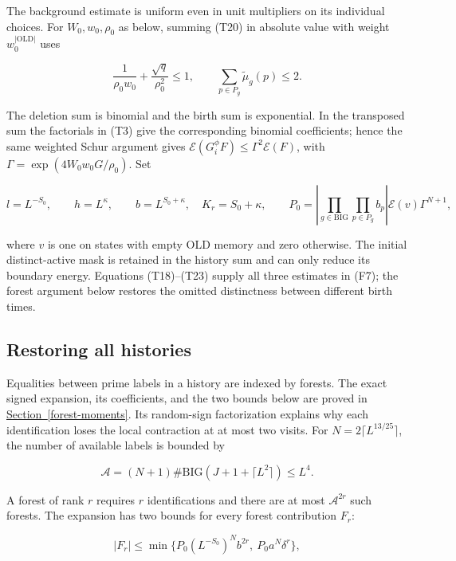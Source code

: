 The background estimate is uniform even in unit multipliers on its
individual choices. For \(W_0,w_0,\rho_0\) as below, summing (T20) in
absolute value with weight \(w_0^{|\mathrm{OLD}|}\) uses

\[
\frac1{\rho_0w_0}+\frac{\sqrt q}{\rho_0^2}\le1,
\qquad \sum_{p\in P_g}\widetilde\mu_g(p)\le2.
\]

The deletion sum is binomial and the birth sum is exponential. In the
transposed sum the factorials in (T3) give the corresponding binomial
coefficients; hence the same weighted Schur argument gives
\(\mathcal E(G_i^\phi F)\le\Gamma^2\mathcal E(F)\), with
\(\Gamma=\exp(4W_0w_0G/\rho_0)\). Set

\[
l=L^{-S_0},\qquad h=L^\kappa,\qquad
b=L^{S_0+\kappa},\quad K_r=S_0+\kappa,\qquad
P_0=\left|\prod_{g\in\mathrm{BIG}}\prod_{p\in P_g}b_p\right|
                \mathcal E(v)\Gamma^{N+1},
\tag{T23}
\]

where \(v\) is one on states with empty OLD memory and zero otherwise.
The initial distinct-active mask is retained in the history sum and can
only reduce its boundary energy. Equations (T18)--(T23) supply all three
estimates in (F7); the forest argument below restores the omitted
distinctness between different birth times.


\hypertarget{marked-correlation-restoring-all-histories}{%
\subsection{Restoring all
histories}\label{marked-correlation-restoring-all-histories}}

Equalities between prime labels in a history are indexed by forests. The
exact signed expansion, its coefficients, and the two bounds below are
proved in
\protect\hyperlink{forest-moments}{Section~\ref{forest-moments}}. Its
random-sign factorization explains why each identification loses the
local contraction at at most two visits. For
\(N=2\lceil L^{13/25}\rceil\), the number of available labels is bounded
by

\[
\mathcal A=(N+1)\#\mathrm{BIG}(J+1+\lceil L^2\rceil)\le L^4.
\]

A forest of rank \(r\) requires \(r\) identifications and there are at
most \(\mathcal A^{2r}\) such forests. The expansion has two bounds for
every forest contribution \(F_r\):

\[
|F_r|\le
\min\{P_0(L^{-S_0})^N b^{2r},\ P_0a^N\delta^r\}, \tag{M15}
\]

